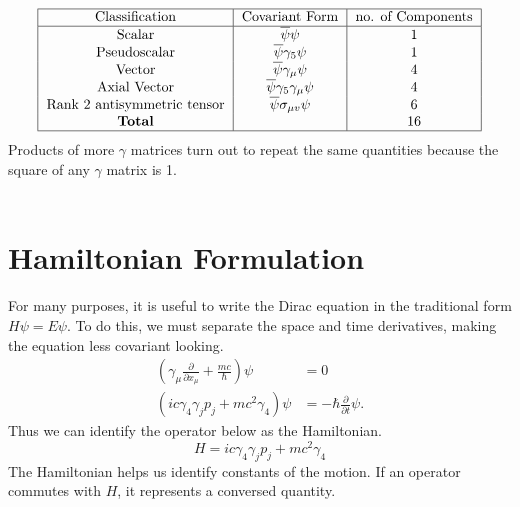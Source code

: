 \documentclass{report}
\begin{document}
\begin{equation}
	\begin{tabular}{|c|c|c|}
		\hline
		Classification              & Covariant Form                                           & no. of Components \\
		\hline
		Scalar                      & $\displaystyle \overline{\psi}\psi$                      & 1                 \\
		Pseudoscalar                & $\displaystyle \overline{\psi}\gamma_{5}\psi$            & 1                 \\
		Vector                      & $\displaystyle \overline{\psi}\gamma_{\mu}\psi$          & 4                 \\
		Axial Vector                & $\displaystyle \overline{\psi}\gamma_5 \gamma_{\mu}\psi$ & 4                 \\
		Rank 2 antisymmetric tensor & $\displaystyle \overline{\psi}\sigma_{\mu v}\psi$        & 6                 \\
		$\mathbf{Total}$            &                                                          & 16                \\
		\hline
	\end{tabular}
\end{equation}
Products of more $\gamma$ matrices turn out to repeat the same quantities because the square of any $\gamma$ matrix is 1.
\\
\\

\section{Hamiltonian Formulation}
For many purposes, it is useful to write the Dirac equation in the traditional form $\displaystyle H \psi = E\psi$. To do this, we must separate the space and time derivatives, making the equation less covariant looking.
\begin{align*}
	\left( \gamma_{\mu} \frac{ \partial  }{ \partial x_{\mu} } + \frac{mc}{\hbar}  \right) \psi & = 0                                             \\
	\left( ic \gamma_4 \gamma_{j} p_{j} + mc^2 \gamma_4 \right) \psi                            & = - \hbar \frac{ \partial  }{ \partial t } \psi
	.\end{align*}
Thus we can identify the operator below as the Hamiltonian.
\begin{equation}
	H = ic \gamma_4 \gamma_{j}p_{j} + mc^2 \gamma_4
\end{equation}
The Hamiltonian helps us identify constants of the motion. If an operator commutes with $H$, it represents a conversed quantity.
\end{document}
